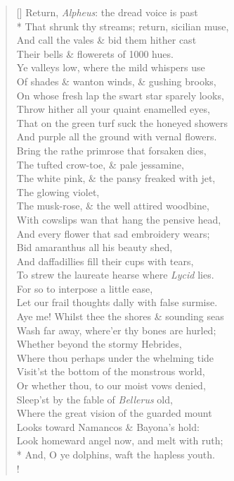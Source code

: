 \documentclass[MAIN]{subfiles}
\begin{document}
\begin{verse}[\versewidth]
Return, \emph{Alpheus}: the dread voice is past\\*
That shrunk thy streams; return, sicilian muse,\\
And call the vales \& bid them hither cast\\
Their bells \& flowerets of 1000 hues.\\
Ye valleys low, where the mild whispers use\\
Of shades \& wanton winds, \& gushing brooks,\\
On whose fresh lap the swart star sparely looks,\\
Throw hither all your quaint enamelled eyes,\\
That on the green turf suck the honeyed showers\\
And purple all the ground with vernal flowers.\\
Bring the rathe primrose that forsaken dies,\\
The tufted crow-toe, \& pale jessamine,\\
The white pink, \& the pansy freaked with jet,\\
The glowing violet,\\
The musk-rose, \& the well attired woodbine,\\
With cowslips wan that hang the pensive head,\\
And every flower that sad embroidery wears;\\
Bid amaranthus all his beauty shed,\\
And daffadillies fill their cups with tears,\\
To strew the laureate hearse where \emph{Lycid} lies.\\
For so to interpose a little ease,\\
Let our frail thoughts dally with false surmise.\\
Aye me! Whilst thee the shores \& sounding seas\\
Wash far away, where'er thy bones are hurled;\\
Whether beyond the stormy Hebrides,\\
Where thou perhaps under the whelming tide\\
Visit'st the bottom of the monstrous world,\\
Or whether thou, to our moist vows denied,\\
Sleep'st by the fable of \emph{Bellerus} old,\\
Where the great vision of the guarded mount\\
Looks toward {\sc Namancos} \& {\sc Bayona}'s hold:\\
Look homeward angel now, and melt with ruth;\\*
And, O ye dolphins, waft the hapless youth.\\!


\end{verse}
\end{document}
